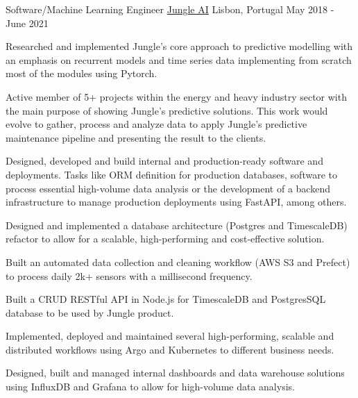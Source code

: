 \begin{cventries}
  \cventry
    {Software/Machine Learning Engineer} %
    {\href{https://www.jungle.ai}{Jungle AI}} %
    {Lisbon, Portugal} %
    {May 2018 - June 2021} %
    {
      \begin{cvitems} %
        \item {Researched and implemented Jungle’s core approach to predictive modelling with an emphasis on recurrent models and time series data implementing from scratch most of the modules using Pytorch.}
        \item {Active member of 5+ projects within the energy and heavy industry sector with the main purpose of showing Jungle’s predictive solutions. This work would evolve to gather, process and analyze data to apply Jungle's predictive maintenance pipeline and presenting the result to the clients.}
        \item {Designed, developed and build internal and production-ready software and deployments. Tasks like ORM definition for production databases, software to process essential high-volume data analysis or the development of a backend infrastructure to manage production deployments using FastAPI, among others.}
        \item {Designed and implemented a database architecture (Postgres and TimescaleDB) refactor to allow for a scalable, high-performing and cost-effective solution.}
        \item {Built an automated data collection and cleaning workflow (AWS S3 and Prefect) to process daily 2k+ sensors with a millisecond frequency.}
        \item {Built a CRUD RESTful API in Node.js for TimescaleDB and PostgresSQL database to be used by Jungle product.}
        \item {Implemented, deployed and maintained several high-performing, scalable and distributed workflows using Argo and Kubernetes to different business needs.}
        \item {Designed, built and managed internal dashboards and data warehouse solutions using InfluxDB and Grafana to allow for high-volume data analysis.}
      \end{cvitems}
    }


\end{cventries}
